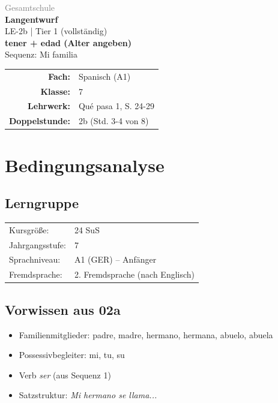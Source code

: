 \documentclass[11pt,a4paper]{article}
\newcommand{\fach}{Spanisch}
\newcommand{\jahrgangsstufe}{7}
\newcommand{\schulart}{Gesamtschule}
\newcommand{\stundenthema}{tener + edad (Alter angeben)}
\newcommand{\reihenthema}{Mi familia}
\newcommand{\stundennummer}{2b}
\newcommand{\gerniveau}{A1}
\newcommand{\lehrwerk}{Qué pasa 1}
\newcommand{\lehrwerkseite}{S. 24-29}
\newcommand{\lerngruppengroesse}{24}
\begin{document}
\begin{titlepage}
    \centering
    \vspace*{2cm}
    {\large\textcolor{gray}{\schulart}}\\[2cm]
    {\Huge\textcolor{fach}{\textbf{Langentwurf}}}\\[0.5cm]
    {\large LE-\stundennummer{} | Tier 1 (vollständig)}\\[2cm]
    {\LARGE\textbf{\stundenthema}}\\[0.5cm]
    {\large Sequenz: \reihenthema}\\[2cm]
    \begin{tabular}{rl}
        \textbf{Fach:} & \fach{} (\gerniveau) \\[0.3cm]
        \textbf{Klasse:} & \jahrgangsstufe \\[0.3cm]
        \textbf{Lehrwerk:} & \lehrwerk, \lehrwerkseite \\[0.3cm]
        \textbf{Doppelstunde:} & \stundennummer{} (Std. 3-4 von 8) \\[0.3cm]
    \end{tabular}
    \vfill
\end{titlepage}

\tableofcontents
\newpage

\section{Bedingungsanalyse}

\subsection{Lerngruppe}
\begin{tabular}{ll}
    Kursgröße: & \lerngruppengroesse{} SuS \\
    Jahrgangsstufe: & \jahrgangsstufe \\
    Sprachniveau: & \gerniveau{} (GER) -- Anfänger \\
    Fremdsprache: & 2. Fremdsprache (nach Englisch) \\
\end{tabular}

\subsection{Vorwissen aus 02a}
\begin{itemize}
    \item Familienmitglieder: padre, madre, hermano, hermana, abuelo, abuela
    \item Possessivbegleiter: mi, tu, su
    \item Verb \textit{ser} (aus Sequenz 1)
    \item Satzstruktur: \textit{Mi hermano se llama...}
\end{itemize}
\end{document}
